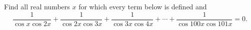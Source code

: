 Find all real numbers $x$ for which every term below is defined and
\[\dfrac{1}{\cos x\cos2x}+\dfrac{1}{\cos2x\cos3x}+\dfrac{1}{\cos3x\cos4x}+\cdots+\dfrac{1}{\cos100x\cos101x}=0.\]
